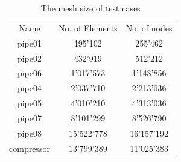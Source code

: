 \documentclass[3p,times]{elsarticle}
\begin{document}
\begin{table}
	\centering
		\begin{tabular} {|c|c|c|}
			\hline
			Name & No. of Elements & No. of nodes \\			
			pipe01 & 195'102 & 255'462 \\ \hline
			pipe02 & 432'919 & 512'212 \\ \hline
			pipe06 & 1'017'573 & 1'148'856 \\ \hline
			pipe04 & 2'037'710 & 2'213'036 \\ \hline
			pipe05 & 4'010'210 & 4'313'036 \\ \hline			
			pipe07 & 8'101'299 & 8'526'790 \\ \hline
			pipe08 & 15'522'778 & 16'157'192 \\ \hline
			compressor & 13'799'389  & 11'025'383 \\ \hline
		\end{tabular}
	\caption{The mesh size of test cases}
	\label{tab:MeshSize}
\end{table}
\end{document}
